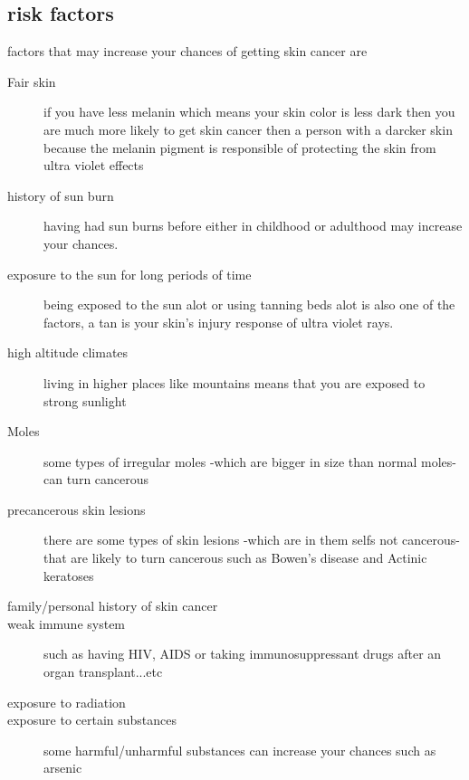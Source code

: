     \subsection{risk factors}
        factors that may increase your chances of getting skin cancer are ~\cite{mayo2020}
        \begin{description}
        \item[Fair skin]
            if you have less melanin which means your skin color is less dark then you are much more likely to get skin cancer then a person with a darcker skin because the melanin pigment is responsible of protecting the skin from ultra violet effects  
        \item[history of sun burn]
            having had sun burns before either in childhood or adulthood may increase your chances.
        \item[exposure to the sun for long periods of time]
            being exposed to the sun alot or using tanning beds alot is also one of the factors, a tan is your skin's injury response of ultra violet rays. 
        \item[high altitude climates]
            living in higher places like mountains means that you are exposed to strong sunlight
        \item[Moles]
            some types of irregular moles -which are bigger in size than normal moles- can turn cancerous
        \item[precancerous skin lesions]
            there are some types of skin lesions -which are in them selfs not cancerous- that are likely to turn cancerous such as Bowen's disease and  Actinic keratoses  
        \item[family/personal history of skin cancer]
        \item[weak immune system]
            such as having HIV, AIDS or taking immunosuppressant drugs after an organ transplant...etc
        \item[exposure to radiation]
        \item[exposure to certain substances]
            some harmful/unharmful substances can increase your chances such as arsenic 
        \end{description}



